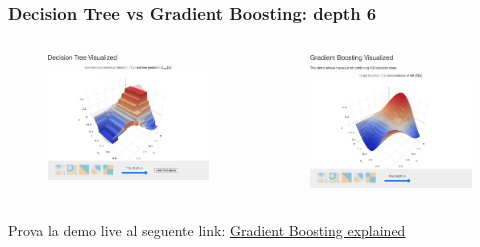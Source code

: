 \begin{frame}
	
	\frametitle{Decision Tree vs Gradient Boosting: depth 6}

	\begin{columns}
		\begin{figure}[!htbp]
			\centering
			\includegraphics[width=1.0\linewidth]{images/supervised/z_algorithms_ensemble/decision_tree_depth_6.png}
		\end{figure}
		
		\begin{figure}[!htbp]
			\centering
			\includegraphics[width=0.93\linewidth]{images/supervised/z_algorithms_ensemble/gradient_boosting_depth_6.png}
		\end{figure}
	\end{columns}
	
	\begin{center}
		Prova la demo live al seguente link: \underline{\href{http://arogozhnikov.github.io/2016/06/24/gradient_boosting_explained.html}{Gradient Boosting explained}}
	\end{center}
	
\end{frame}